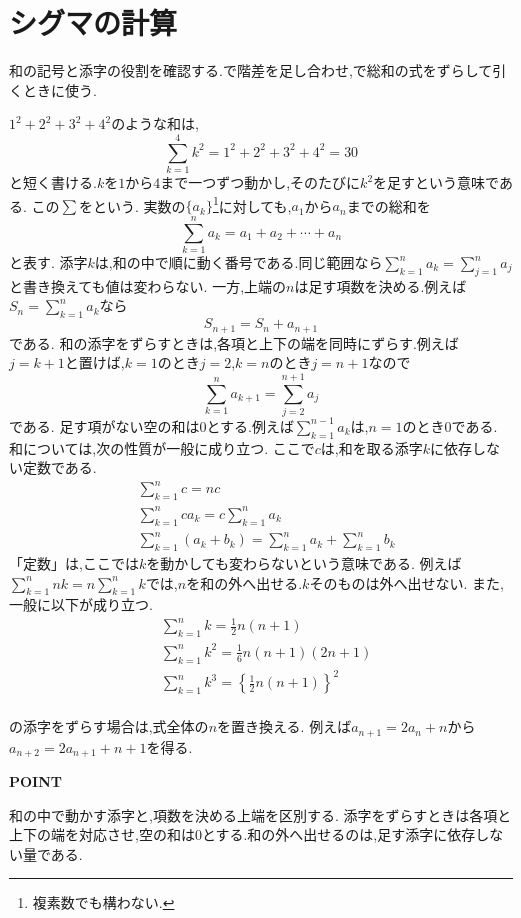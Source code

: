 
\section{シグマの計算}\label{節：シグマの計算}
和の記号と添字の役割を確認する.で階差を足し合わせ,で総和の式をずらして引くときに使う.

$1^2+2^2+3^2+4^2$のような和は,
\[
  \sum_{k=1}^{4}k^2=1^2+2^2+3^2+4^2=30
\]
と短く書ける.$k$を$1$から$4$まで一つずつ動かし,そのたびに$k^2$を足すという意味である.
この$\sum$をという.
実数の$\{a_k\}$\footnote{複素数でも構わない.}に対しても,$a_1$から$a_n$までの総和を
\[
  \sum_{k=1}^{n} a_k=a_1+a_2+\cdots+ a_n
\]
と表す.
添字$k$は,和の中で順に動く番号である.同じ範囲なら$\sum_{k=1}^{n}a_k=\sum_{j=1}^{n}a_j$と書き換えても値は変わらない.
一方,上端の$n$は足す項数を決める.例えば$S_n=\sum_{k=1}^{n}a_k$なら
\[
  S_{n+1}=S_n+a_{n+1}
\]
である.
和の添字をずらすときは,各項と上下の端を同時にずらす.例えば$j=k+1$と置けば,$k=1$のとき$j=2$,$k=n$のとき$j=n+1$なので
\[
  \sum_{k=1}^{n}a_{k+1}=\sum_{j=2}^{n+1}a_j
\]
である.
足す項がない空の和は$0$とする.例えば$\sum_{k=1}^{n-1}a_k$は,$n=1$のとき$0$である.
和については,次の性質が一般に成り立つ.
ここで$c$は,和を取る添字$k$に依存しない定数である.
\begin{align*}
  &\sum_{k=1}^{n} c=nc\\
  &\sum_{k=1}^{n} ca_k=c\sum_{k=1}^{n} a_k\\
  &\sum_{k=1}^{n} (a_k+b_k)=\sum_{k=1}^{n} a_k+\sum_{k=1}^{n} b_k
\end{align*}
「定数」は,ここでは$k$を動かしても変わらないという意味である.
例えば$\sum_{k=1}^{n}nk=n\sum_{k=1}^{n}k$では,$n$を和の外へ出せる.$k$そのものは外へ出せない.
また,一般に以下が成り立つ.
\begin{align*}
  &\sum_{k=1}^{n} k=\frac{1}{2}n(n+1)\\
  &\sum_{k=1}^{n} k^2=\frac{1}{6}n(n+1)(2n+1)\\
  &\sum_{k=1}^{n} k^3=\left\{\frac{1}{2}n(n+1)\right\}^2\\
\end{align*}

の添字をずらす場合は,式全体の$n$を置き換える.
例えば$a_{n+1}=2a_n+n$から$a_{n+2}=2a_{n+1}+n+1$を得る.

\begin{bookpoint}
  \textbf{POINT}\par
  和の中で動かす添字と,項数を決める上端を区別する.
  添字をずらすときは各項と上下の端を対応させ,空の和は0とする.和の外へ出せるのは,足す添字に依存しない量である.
\end{bookpoint}
